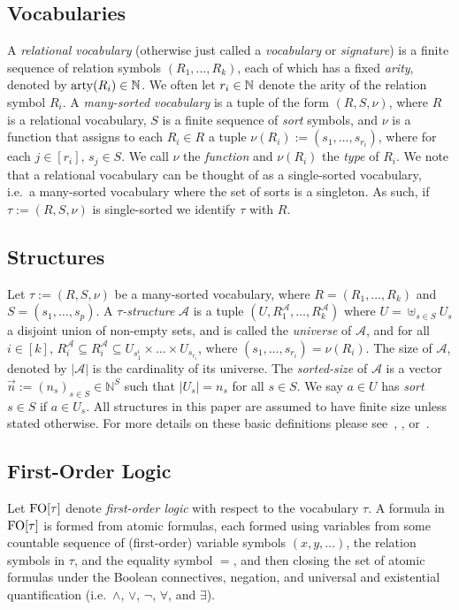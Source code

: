 \documentclass[../main/thesis.tex]{subfiles}
\begin{document}
\subsection{Vocabularies}
A \emph{relational vocabulary} (otherwise just called a \emph{vocabulary} or
\emph{signature}) is a finite sequence of relation symbols $(R_1, \ldots, R_k)$,
each of which has a fixed \emph{arity}, denoted by $\mathrm{arty}(R_i) \in \mathbb{N}$. We
often let $r_i \in \mathbb{N}$ denote the arity of the relation symbol $R_i$. A
\emph{many-sorted vocabulary} is a tuple of the form $(R, S, \nu)$, where $R$ is
a relational vocabulary, $S$ is a finite sequence of \emph{sort} symbols, and
$\nu$ is a function that assigns to each $R_i \in R$ a tuple $\nu(R_i) := (s_1,
\ldots, s_{r_i})$, where for each $j \in [r_i]$, $s_j \in S$. We call $\nu$ the
\emph{\type function} and $\nu(R_i)$ the \emph{type} of $R_i$. We note that a
relational vocabulary can be thought of as a single-sorted vocabulary, i.e.\ a
many-sorted vocabulary where the set of sorts is a singleton. As such, if $\tau
:= (R, S, \nu)$ is single-sorted we identify $\tau$ with $R$.

\subsection{Structures}
Let $\tau := (R, S, \nu)$ be a many-sorted vocabulary, where $R = (R_1, \ldots,
R_k)$ and $S = (s_1, \ldots , s_p)$. A \emph{$\tau$-structure} $\mathcal{A}$ is
a tuple $(U , R^{\mathcal{A}}_1 , \ldots , R^{\mathcal{A}}_k)$ where $U =
\uplus_{s \in S } U_{s}$ a disjoint union of non-empty sets, and is called the
\emph{universe} of $\mathcal{A}$, and for all $i \in [k]$, $R^{\mathcal{A}}_i
\subseteq R^{\mathcal{A}}_i \subseteq U_{s^i_1} \times \ldots \times
U_{s_{r_i}}$, where $(s_1 , \ldots , s_{r_i}) = \nu (R_i)$. The size of
$\mathcal{A}$, denoted by $\vert \mathcal{A} \vert$ is the cardinality of its
universe. The \emph{sorted-size} of $\mathcal{A}$ is a vector $\vec{n} :=
(n_{s})_{s \in S} \in \mathbb{N}^{S}$ such that $\vert U_{s} \vert = n_{s}$ for
all $s \in S$. We say $a \in U$ has \emph{sort} $s \in S$ if $a \in U_s$. All
structures in this paper are assumed to have finite size unless stated
otherwise. For more details on these basic definitions please
see~\cite{Gradel:2005}, \cite{immerman1999descriptive},
or~\cite{grohe2017descriptive}.

\subsection{First-Order Logic}
Let $\text{\upshape FO}[\tau]$ denote \emph{first-order logic} with respect to the vocabulary
$\tau$. A formula in $\text{\upshape FO}[\tau]$ is formed from atomic formulas, each formed
using variables from some countable sequence of (first-order) variable symbols
$(x, y, \ldots)$, the relation symbols in $\tau$, and the equality symbol $=$,
and then closing the set of atomic formulas under the Boolean connectives,
negation, and universal and existential quantification (i.e.\ $\land$, $\lor$,
$\neg$, $\forall$, and $\exists$).
\end{document}
